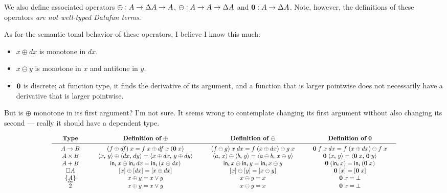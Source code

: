 \documentclass{article}
\theoremstyle{plain}
\theoremstyle{definition}
\begin{document}
We also define associated operators $\oplus : A \to \Delta A \to A$, $\ominus : A
\to A \to \Delta A$ and $\mathbf{0} : A \to \Delta A$. Note, however, the
definitions of these operators \emph{are not well-typed Datafun terms}. 

As for the semantic tonal behavior of these operators, I believe I know this
much:
\begin{itemize}
\item $x \oplus dx$ is monotone in $dx$.
\item $x \ominus y$ is monotone in $x$ and antitone in $y$.
\item $\mathbf{0}$ is discrete; at function type, it finds the derivative of its
  argument, and a function that is larger pointwise does not necessarily have a
  derivative that is larger pointwise.
\end{itemize}

But is $\oplus$ monotone in its first argument? I'm not sure. It seems wrong to
contemplate changing its first argument without also changing its second ---
really it should have a dependent type.

\begin{center}
\[
\scalebox{0.85}{\(
\arraycolsep=1.5em
\begin{array}{cccc}
  \textbf{Type}
  & {\textbf{Definition of}~\oplus}
  & {\textbf{Definition of}~\ominus}
  & {\textbf{Definition of}~\zero}
  \\\midrule
  A \to B
  & (f \oplus df)\; x = f\; x \oplus df\; x\; (\zero\; x)
  & (f \ominus g)\; x \;dx = f\; (x \oplus dx) \ominus g \; x
  & \zero\; f\; x\; dx = f\; (x \oplus dx) \ominus f\; x
  \\
  A \x B
  & \pair{x}{y} \oplus \pair{dx}{dy} = \pair{x \oplus dx}{y \oplus dy}
  & \pair{a}{x} \ominus \pair{b}{y} = \pair{a \ominus b}{x \ominus y}
  & \zero \; \pair{x}{y} = \pair{\zero\; x}{\zero\; y}
  \\
  A + B
  & \inj{i}{x} \oplus \inj{i}{dx} = \inj{i}{(x \oplus dx)}
  & \inj{i}{x} \ominus \inj{i}{y} = \inj{i}{x \ominus y}
  & \zero\; (\inj{i}{x}) = \inj{i}{(\zero\;x)}
  \\
  \Disc{A}
  & \disc{x} \oplus \disc{dx} = \disc{x \oplus dx}
  & \disc{x} \ominus \disc{y} = \disc{x \ominus y}
  & \zero\; \disc{x} = \disc{\zero\; x}
  \\
  \Seteq{A}
  & x \oplus y = x \vee y
  & x \ominus y = x
  & \zero\; x = \unit
  \\
  \tbool
  & x \oplus y = x \vee y
  & x \ominus y = x
  & \zero\; x = \unit
\end{array}
\)}
\]
\end{center}
\end{document}
